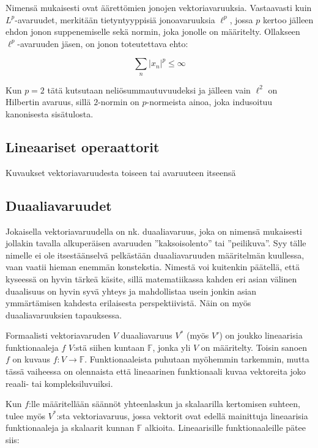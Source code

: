 \documentclass[../johdoksia.tex]{subfiles}
\begin{document}
	Nimensä mukaisesti ovat äärettömien jonojen vektoriavaruuksia. Vastaavasti kuin $L^p$-avaruudet, merkitään tietyntyyppisiä jonoavaruuksia $\ell^p$, jossa $p$ kertoo jälleen ehdon jonon suppenemiselle sekä normin, joka jonolle on määritelty. Ollakseen $\ell^p$-avaruuden jäsen, on jonon toteutettava ehto:
	
	\begin{equation}
		\sum_n |x_n|^p \leq \infty
	\end{equation}

	Kun $p = 2$ tätä kutsutaan neliösummautuvuudeksi ja jälleen vain $\ell^2$ on Hilbertin avaruus, sillä $2$-normin on $p$-normeista ainoa, joka indusoituu kanonisesta sisätulosta.
	
	\subsection{Lineaariset operaattorit}
	
	Kuvaukset vektoriavaruudesta toiseen tai avaruuteen itseensä
	
	\subsection{Duaaliavaruudet}
	
	Jokaisella vektoriavaruudella on nk. duaaliavaruus, joka on nimensä mukaisesti jollakin tavalla alkuperäisen avaruuden ''kaksoisolento'' tai ''peilikuva''. Syy tälle nimelle ei ole itsestäänselvä pelkästään duaaliavaruuden määritelmän kuullessa, vaan vaatii hieman enemmän konstekstia. Nimestä voi kuitenkin päätellä, että kyseessä on hyvin tärkeä käsite, sillä matematiikassa kahden eri asian välinen duaalisuus on hyvin syvä yhteys ja mahdollistaa usein jonkin asian ymmärtämisen kahdesta erilaisesta perspektiivistä. Näin on myös duaaliavaruuksien tapauksessa.
	
	Formaalisti vektoriavaruden $V$ duaaliavaruus $V^\ast$ (myös $V'$) on joukko lineaarisia funktionaaleja $f$ $V$:stä siihen kuntaan $\mathbb{F}$, jonka yli $V$ on määritelty. Toisin sanoen $f$ on kuvaus $f: V \to \mathbb{F}$. Funktionaaleista puhutaan myöhemmin tarkemmin, mutta tässä vaiheessa on olennaista että lineaarinen funktionaali kuvaa vektoreita joko reaali- tai kompleksiluvuiksi.
	
	Kun $f$:lle määritellään säännöt yhteenlaskun ja skalaarilla kertomisen suhteen, tulee myös $V^\ast$:sta vektoriavaruus, jossa vektorit ovat edellä mainittuja lineaarisia funktionaaleja ja skalaarit kunnan $\mathbb{F}$ alkioita. Lineaarisille funktionaaleille pätee siis:
	
\end{document}
